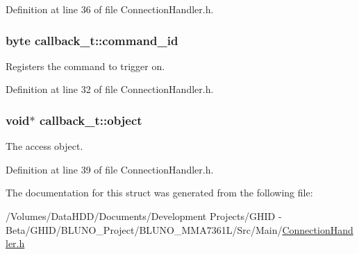 \-Definition at line 36 of file \-Connection\-Handler.\-h.

\hypertarget{structcallback__t_ada2c0e2a936e49f0ece582c40953c278}{
\subsubsection[{command\-\_\-id}]{\setlength{\rightskip}{0pt plus 5cm}byte {\bf callback\-\_\-t\-::command\-\_\-id}}}\label{structcallback__t_ada2c0e2a936e49f0ece582c40953c278}


\-Registers the command to trigger on. 



\-Definition at line 32 of file \-Connection\-Handler.\-h.

\hypertarget{structcallback__t_a30ed93032c0a2ead09070156d7c37790}{
\subsubsection[{object}]{\setlength{\rightskip}{0pt plus 5cm}void$\ast$ {\bf callback\-\_\-t\-::object}}}\label{structcallback__t_a30ed93032c0a2ead09070156d7c37790}


\-The access object. 



\-Definition at line 39 of file \-Connection\-Handler.\-h.



\-The documentation for this struct was generated from the following file\-:\begin{DoxyCompactItemize}
\item 
/\-Volumes/\-Data\-H\-D\-D/\-Documents/\-Development Projects/\-G\-H\-I\-D -\/ Beta/\-G\-H\-I\-D/\-B\-L\-U\-N\-O\-\_\-\-Project/\-B\-L\-U\-N\-O\-\_\-\-M\-M\-A7361\-L/\-Src/\-Main/\hyperlink{_connection_handler_8h}{\-Connection\-Handler.\-h}\end{DoxyCompactItemize}
